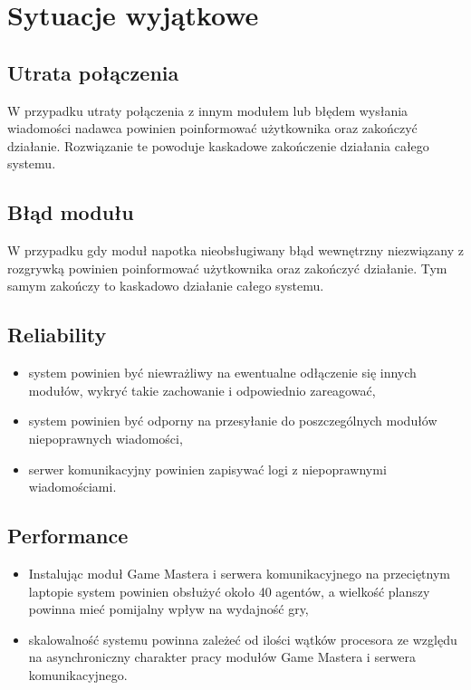 \documentclass[Dokumentacja.tex]{subfiles}
\begin{document}
\section{Sytuacje wyjątkowe}
\subsection{}
\subsection{Utrata połączenia}
W przypadku utraty połączenia z innym modułem lub błędem wysłania wiadomości nadawca powinien poinformować użytkownika
oraz zakończyć działanie. Rozwiązanie te powoduje kaskadowe zakończenie działania całego systemu.
\subsection{Błąd modułu}
W przypadku gdy moduł napotka nieobsługiwany błąd wewnętrzny niezwiązany z rozgrywką powinien poinformować użytkownika
oraz zakończyć działanie. Tym samym zakończy to kaskadowo działanie całego systemu.

\subsection{Reliability}
\begin{itemize}
    \item system powinien być niewrażliwy na ewentualne odłączenie się innych modułów,
    wykryć takie zachowanie i odpowiednio zareagować,
    \item system powinien być odporny na przesyłanie do poszczególnych modułów niepoprawnych wiadomości,
    \item serwer komunikacyjny powinien zapisywać logi z niepoprawnymi wiadomościami.
\end{itemize}

\subsection{Performance}
\begin{itemize}
    \item Instalując moduł Game Mastera i serwera komunikacyjnego na przeciętnym laptopie system powinien obsłużyć około 40 agentów,
    a wielkość planszy powinna mieć pomijalny wpływ na wydajność gry,
    \item skalowalność systemu powinna zależeć od ilości wątków procesora ze względu na asynchroniczny charakter pracy modułów
    Game Mastera i serwera komunikacyjnego.
\end{itemize}
\end{document}
